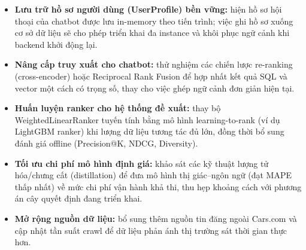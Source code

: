 \begin{itemize}
    \item \textbf{Lưu trữ hồ sơ người dùng (UserProfile) bền vững:} hiện hồ sơ hội thoại của chatbot được lưu in-memory theo tiến trình; việc ghi hồ sơ xuống cơ sở dữ liệu sẽ cho phép triển khai đa instance và khôi phục ngữ cảnh khi backend khởi động lại.
    \item \textbf{Nâng cấp truy xuất cho chatbot:} thử nghiệm các chiến lược re-ranking (cross-encoder) hoặc Reciprocal Rank Fusion để hợp nhất kết quả SQL và vector một cách có trọng số, thay cho việc ghép ngữ cảnh đơn giản hiện tại.
    \item \textbf{Huấn luyện ranker cho hệ thống đề xuất:} thay bộ WeightedLinearRanker tuyến tính bằng mô hình learning-to-rank (ví dụ LightGBM ranker) khi lượng dữ liệu tương tác đủ lớn, đồng thời bổ sung đánh giá offline (Precision@K, NDCG, Diversity).
    \item \textbf{Tối ưu chi phí mô hình định giá:} khảo sát các kỹ thuật lượng tử hóa/chưng cất (distillation) để đưa mô hình thị giác--ngôn ngữ (đạt MAPE thấp nhất) về mức chi phí vận hành khả thi, thu hẹp khoảng cách với phương án cây quyết định đang triển khai.
    \item \textbf{Mở rộng nguồn dữ liệu:} bổ sung thêm nguồn tin đăng ngoài Cars.com và cập nhật tần suất crawl để dữ liệu phản ánh thị trường sát thời gian thực hơn.
\end{itemize}
